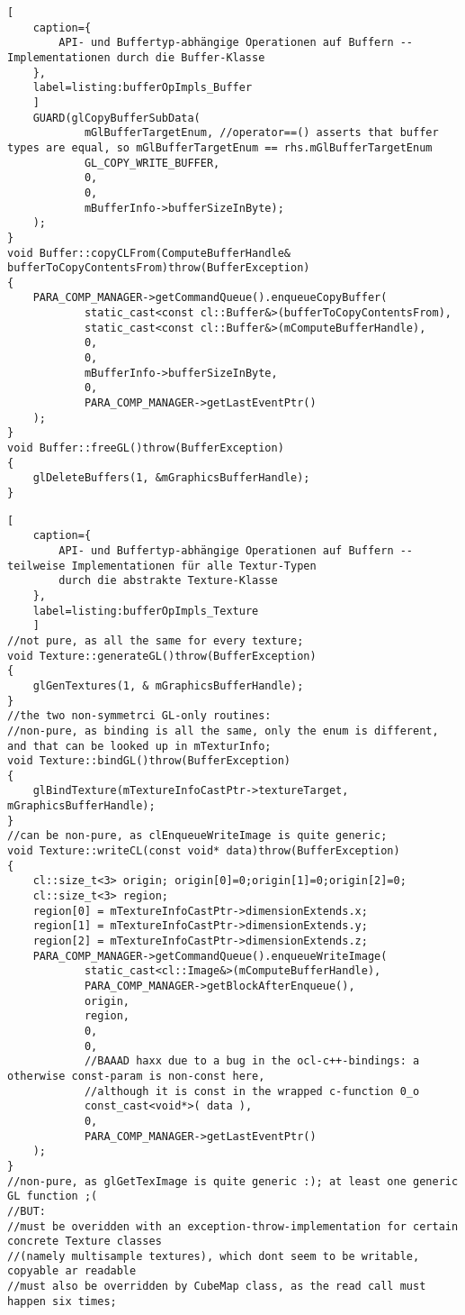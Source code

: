 \begin{lstlisting}[
	caption={
		API- und Buffertyp-abhängige Operationen auf Buffern -- Implementationen durch die Buffer-Klasse
	},
	label=listing:bufferOpImpls_Buffer
	]
	GUARD(glCopyBufferSubData(
			mGlBufferTargetEnum, //operator==() asserts that buffer types are equal, so mGlBufferTargetEnum == rhs.mGlBufferTargetEnum
			GL_COPY_WRITE_BUFFER,
			0,
			0,
			mBufferInfo->bufferSizeInByte);
	);
}
void Buffer::copyCLFrom(ComputeBufferHandle& bufferToCopyContentsFrom)throw(BufferException)
{
	PARA_COMP_MANAGER->getCommandQueue().enqueueCopyBuffer(
			static_cast<const cl::Buffer&>(bufferToCopyContentsFrom),
			static_cast<const cl::Buffer&>(mComputeBufferHandle),
			0,
			0,
			mBufferInfo->bufferSizeInByte,
			0,
			PARA_COMP_MANAGER->getLastEventPtr()
	);
}
void Buffer::freeGL()throw(BufferException)
{
	glDeleteBuffers(1, &mGraphicsBufferHandle);
}
\end{lstlisting}




\begin{lstlisting}[
	caption={
		API- und Buffertyp-abhängige Operationen auf Buffern -- teilweise Implementationen für alle Textur-Typen
		durch die abstrakte Texture-Klasse
	},	
	label=listing:bufferOpImpls_Texture
	]	
//not pure, as all the same for every texture;
void Texture::generateGL()throw(BufferException)
{
	glGenTextures(1, & mGraphicsBufferHandle);
}
//the two non-symmetrci GL-only routines:
//non-pure, as binding is all the same, only the enum is different, and that can be looked up in mTexturInfo;
void Texture::bindGL()throw(BufferException)
{
	glBindTexture(mTextureInfoCastPtr->textureTarget, mGraphicsBufferHandle);
}
//can be non-pure, as clEnqueueWriteImage is quite generic;
void Texture::writeCL(const void* data)throw(BufferException)
{
	cl::size_t<3> origin; origin[0]=0;origin[1]=0;origin[2]=0;
	cl::size_t<3> region;
	region[0] =	mTextureInfoCastPtr->dimensionExtends.x;
	region[1] =	mTextureInfoCastPtr->dimensionExtends.y;
	region[2] =	mTextureInfoCastPtr->dimensionExtends.z;
	PARA_COMP_MANAGER->getCommandQueue().enqueueWriteImage(
			static_cast<cl::Image&>(mComputeBufferHandle),
			PARA_COMP_MANAGER->getBlockAfterEnqueue(),
			origin,
			region,
			0,
			0,
			//BAAAD haxx due to a bug in the ocl-c++-bindings: a otherwise const-param is non-const here,
			//although it is const in the wrapped c-function 0_o
			const_cast<void*>( data ),
			0,
			PARA_COMP_MANAGER->getLastEventPtr()
	);
}
//non-pure, as glGetTexImage is quite generic :); at least one generic GL function ;(
//BUT:
//must be overidden with an exception-throw-implementation for certain concrete Texture classes
//(namely multisample textures), which dont seem to be writable, copyable ar readable
//must also be overridden by CubeMap class, as the read call must happen six times;

\end{lstlisting}
